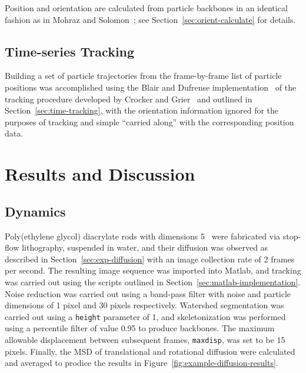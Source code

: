 Position and orientation are calculated from particle backbones 
in an identical fashion as in Mohraz and Solomon~\cite{rods-mohraz}; see
Section~\ref{sec:orient-calculate} for details.

\subsection{Time-series Tracking}

Building a set of particle trajectories from the frame-by-frame list of particle positions
was accomplished using the Blair and Dufrense implementation~\cite{blair-dufrense-matlab} of 
the tracking procedure developed by Crocker and Grier~\cite{crocker-grier-spheres} and outlined 
in Section~\ref{sec:time-tracking}, with the orientation information ignored for the purposes of
tracking and simple ``carried along'' with the corresponding position data.


\section{Results and Discussion}
\label{sec:track-results}

\subsection{Dynamics}


Poly(ethylene glycol) diacrylate rods with dimensions 5   \microns~were fabricated via 
stop-flow lithography, suspended in 
water, and their diffusion was observed as described in Section~\ref{sec:exp-diffusion} with an 
image collection
rate of 2 
frames per second.  The resulting image sequence was imported into Matlab, and tracking was carried out
using the scripts outlined in Section~\ref{sec:matlab-implementation}.  Noise reduction was carried out using 
a band-pass filter with noise and particle dimensions of 1 pixel and 30 pixels respectively. 
Watershed segmentation was carried out using a \texttt{height} parameter of 1, and skeletonization
was performed using a percentile filter of value 0.95 to produce backbones.  The maximum allowable 
displacement between subsequent frames, \texttt{maxdisp}, was set to be 15 pixels.  Finally, the 
MSD of translational and rotational diffusion were calculated and averaged to prodice the results in 
Figure~\ref{fig:example-diffusion-results}.

